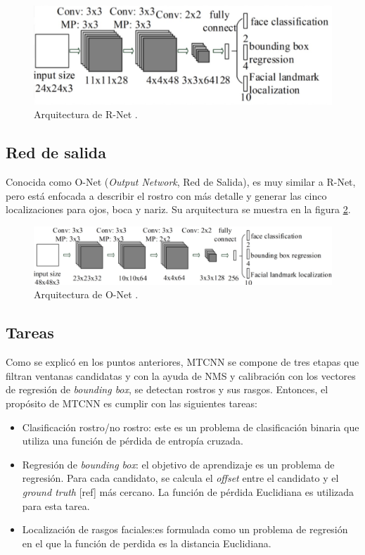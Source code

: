 \begin{figure}[h]
	\centering
	\includegraphics[scale=0.25]{./Figures/mtcnn_rnet.png}
	\caption{Arquitectura de R-Net \cite{mtcnn_info}.}
	\label{fig:mtcnn_rnet}
\end{figure}

\subsection{Red de salida}
Conocida como O-Net (\textit{Output Network}, Red de Salida), es muy similar a R-Net, pero está enfocada a describir el rostro con más detalle y generar las cinco localizaciones para ojos, boca y nariz. Su arquitectura se muestra en la figura \ref{fig:mtcnn_onet}.

\begin{figure}[h]
	\centering
	\includegraphics[scale=0.3]{./Figures/mtcnn_onet.png}
	\caption{Arquitectura de O-Net \cite{mtcnn_info}.}
	\label{fig:mtcnn_onet}
\end{figure}

\subsection{Tareas}
Como se explicó en los puntos anteriores, MTCNN se compone de tres etapas que filtran ventanas candidatas y con la ayuda de NMS y calibración con los vectores de regresión de \textit{bounding box}, se detectan rostros y sus rasgos. Entonces, el propósito de MTCNN es cumplir con las siguientes tareas:
\begin{itemize}
	\item Clasificación rostro/no rostro: este es un problema de clasificación binaria que utiliza una función de pérdida de entropía cruzada.
	\item Regresión de \textit{bounding box}: el objetivo de aprendizaje es un problema de regresión. Para cada candidato, se calcula el \textit{offset} entre el candidato y el \textit{ground truth} [ref] más cercano. La función de pérdida Euclidiana es utilizada para esta tarea.
	\item Localización de rasgos faciales:es formulada como un problema de regresión en el que la función de perdida es la distancia Euclidiana.
\end{itemize}

